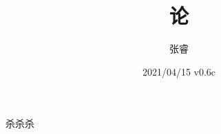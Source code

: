 \documentclass[zihao = -4, linespread = 1.5]{ctexart}
\title{论}
\author{张睿}
\date{2021/04/15 \quad v0.6c}
\begin{document}
\maketitle



\tableofcontents











杀杀杀
\end{document}
